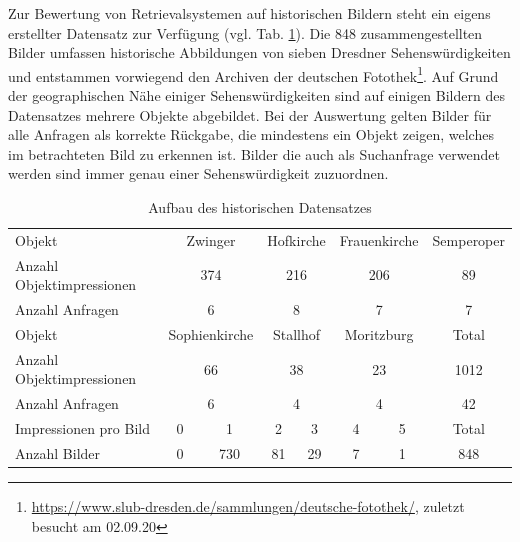 Zur Bewertung von Retrievalsystemen auf historischen Bildern steht ein eigens erstellter Datensatz zur Verfügung (vgl. Tab. \ref{hist4d_data}). Die 848 zusammengestellten Bilder umfassen historische Abbildungen von sieben Dresdner Sehenswürdigkeiten und entstammen vorwiegend den Archiven der deutschen Fotothek\footnote{\url{https://www.slub-dresden.de/sammlungen/deutsche-fotothek/}, zuletzt besucht am 02.09.20}. Auf Grund der geographischen Nähe einiger Sehenswürdigkeiten sind auf einigen Bildern des Datensatzes mehrere Objekte abgebildet. Bei der Auswertung gelten Bilder für alle Anfragen als korrekte Rückgabe, die mindestens ein Objekt zeigen, welches im betrachteten Bild zu erkennen ist. Bilder die auch als Suchanfrage verwendet werden sind immer genau einer Sehenswürdigkeit zuzuordnen.
\begin{table}[h]
\centering

\begin{tabular}{l|c|c|c|c|c|c|c}
\rowcolor[HTML]{C0C0C0} 
Objekt &
  \multicolumn{2}{c|}{\cellcolor[HTML]{C0C0C0}Zwinger} &
  \multicolumn{2}{c|}{\cellcolor[HTML]{C0C0C0}Hofkirche} &
  \multicolumn{2}{c|}{\cellcolor[HTML]{C0C0C0}Frauenkirche} &
  Semperoper \\
Anzahl Objektimpressionen & \multicolumn{2}{c|}{374} & \multicolumn{2}{c|}{216} & \multicolumn{2}{c|}{206} & 89    \\
Anzahl Anfragen           & \multicolumn{2}{c|}{6}   & \multicolumn{2}{c|}{8}   & \multicolumn{2}{c|}{7}   & 7     \\ \hline
\rowcolor[HTML]{C0C0C0} 
Objekt &
  \multicolumn{2}{c|}{\cellcolor[HTML]{C0C0C0}Sophienkirche} &
  \multicolumn{2}{c|}{\cellcolor[HTML]{C0C0C0}Stallhof} &
  \multicolumn{2}{c|}{\cellcolor[HTML]{C0C0C0}Moritzburg} &
  Total \\
Anzahl Objektimpressionen & \multicolumn{2}{c|}{66}  & \multicolumn{2}{c|}{38}  & \multicolumn{2}{c|}{23}  & 1012  \\
Anzahl Anfragen           & \multicolumn{2}{c|}{6}   & \multicolumn{2}{c|}{4}   & \multicolumn{2}{c|}{4}   & 42    \\ \hline
\rowcolor[HTML]{C0C0C0} 
Impressionen pro Bild     & \hspace{2.5mm} 0 \hspace{2.5mm}         & 1           & \hspace{1.1mm} 2 \hspace{1.1mm}           & 3          & \hspace{2mm} 4 \hspace{2mm}           & 5          & Total \\
Anzahl Bilder             & 0          & 730         & 81          & 29         & 7           & 1          & 848  
\end{tabular}%

\caption{Aufbau des historischen Datensatzes}
\label{hist4d_data}
\end{table}
